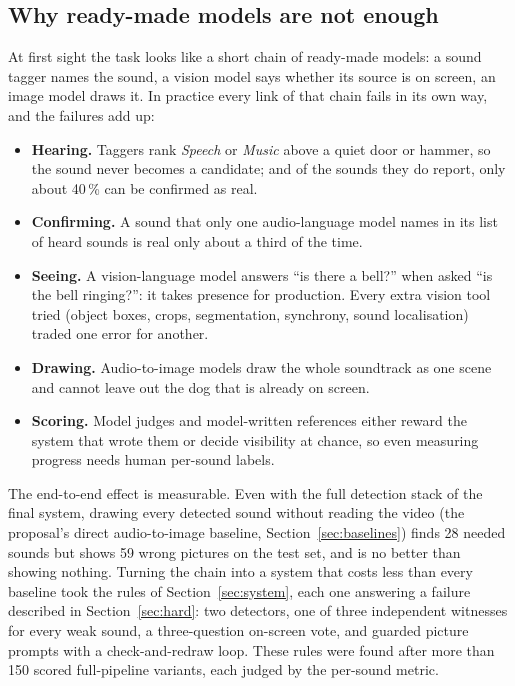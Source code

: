 \subsection{Why ready-made models are not enough}\label{sec:notplug}
At first sight the task looks like a short chain of ready-made models: a sound tagger names the sound, a vision model
says whether its source is on screen, an image model draws it. In practice every link of that chain fails in its own
way, and the failures add up:
\begin{itemize}
  \item \textbf{Hearing.} Taggers rank \emph{Speech} or \emph{Music} above a quiet door or hammer, so the sound never
        becomes a candidate; and of the sounds they do report, only about 40\,\% can be confirmed as real.
  \item \textbf{Confirming.} A sound that only one audio-language model names in its list of heard sounds is real only
        about a third of the time.
  \item \textbf{Seeing.} A vision-language model answers ``is there a bell?'' when asked ``is the bell ringing?'': it takes
        presence for production. Every extra vision tool tried (object boxes, crops, segmentation, synchrony, sound
        localisation) traded one error for another.
  \item \textbf{Drawing.} Audio-to-image models draw the whole soundtrack as one scene and cannot leave out the dog that is
        already on screen.
  \item \textbf{Scoring.} Model judges and model-written references either reward the system that wrote them or decide
        visibility at chance, so even measuring progress needs human per-sound labels.
\end{itemize}
The end-to-end effect is measurable. Even with the full detection stack of the final system, drawing every detected
sound without reading the video (the proposal's direct audio-to-image baseline, Section~\ref{sec:baselines}) finds 28 needed
sounds but shows 59 wrong pictures on the test set, and is no better than showing nothing. Turning the chain into a
system that costs less than every baseline took the rules of Section~\ref{sec:system}, each one answering a failure described in
Section~\ref{sec:hard}: two detectors, one of three independent witnesses for every weak sound, a three-question
on-screen vote, and guarded picture prompts with a check-and-redraw loop. These rules were found after more than 150
scored full-pipeline variants, each judged by the per-sound metric.


